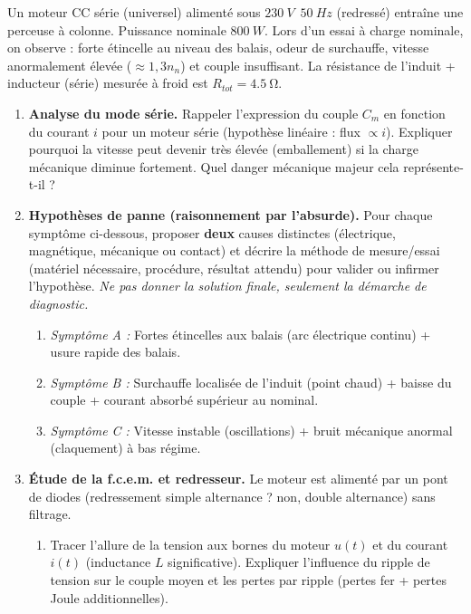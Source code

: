 \documentclass[11pt]{article}
\begin{document}
\begin{exercice}
Un moteur CC série (universel) alimenté sous $\SI{230}{V}$~$50~Hz$ (redressé) entraîne une perceuse à colonne. Puissance nominale $\SI{800}{W}$. Lors d'un essai à charge nominale, on observe : forte étincelle au niveau des balais, odeur de surchauffe, vitesse anormalement élevée ($\approx 1,3 n_n$) et couple insuffisant. La résistance de l'induit + inducteur (série) mesurée à froid est $R_{tot} = \SI{4,5}{\ohm}$.

\begin{enumerate}
    \item \textbf{Analyse du mode série.} Rappeler l'expression du couple $C_m$ en fonction du courant $i$ pour un moteur série (hypothèse linéaire : flux $\propto i$). Expliquer pourquoi la vitesse peut devenir très élevée (emballement) si la charge mécanique diminue fortement. Quel danger mécanique majeur cela représente-t-il ?
    \item \textbf{Hypothèses de panne (raisonnement par l'absurde).} Pour chaque symptôme ci-dessous, proposer \textbf{deux} causes distinctes (électrique, magnétique, mécanique ou contact) et décrire la méthode de mesure/essai (matériel nécessaire, procédure, résultat attendu) pour valider ou infirmer l'hypothèse. \textit{Ne pas donner la solution finale, seulement la démarche de diagnostic.}
    \begin{enumerate}
        \item \textit{Symptôme A :} Fortes étincelles aux balais (arc électrique continu) + usure rapide des balais.
        \item \textit{Symptôme B :} Surchauffe localisée de l'induit (point chaud) + baisse du couple + courant absorbé supérieur au nominal.
        \item \textit{Symptôme C :} Vitesse instable (oscillations) + bruit mécanique anormal (claquement) à bas régime.
    \end{enumerate}
    \item \textbf{Étude de la f.c.e.m. et redresseur.} Le moteur est alimenté par un pont de diodes (redressement simple alternance ? non, double alternance) sans filtrage.
    \begin{enumerate}
        \item Tracer l'allure de la tension aux bornes du moteur $u(t)$ et du courant $i(t)$ (inductance $L$ significative). Expliquer l'influence du ripple de tension sur le couple moyen et les pertes par ripple (pertes fer + pertes Joule additionnelles).

\end{enumerate}
\end{enumerate}
\end{exercice}
\end{document}
